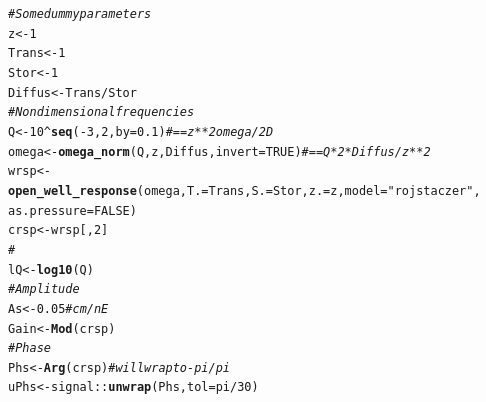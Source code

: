 \documentclass[10pt]{article}\usepackage[]{graphicx}\usepackage[]{color}
\makeatletter
\newcommand{\hlnum}[1]{\textcolor[rgb]{0.686,0.059,0.569}{#1}}%
\newcommand{\hlstr}[1]{\textcolor[rgb]{0.192,0.494,0.8}{#1}}%
\newcommand{\hlcom}[1]{\textcolor[rgb]{0.678,0.584,0.686}{\textit{#1}}}%
\newcommand{\hlopt}[1]{\textcolor[rgb]{0,0,0}{#1}}%
\newcommand{\hlstd}[1]{\textcolor[rgb]{0.345,0.345,0.345}{#1}}%
\newcommand{\hlkwb}[1]{\textcolor[rgb]{0.69,0.353,0.396}{#1}}%
\newcommand{\hlkwc}[1]{\textcolor[rgb]{0.333,0.667,0.333}{#1}}%
\newcommand{\hlkwd}[1]{\textcolor[rgb]{0.737,0.353,0.396}{\textbf{#1}}}%
\newenvironment{kframe}{%
 \def\at@end@of@kframe{}%
 \ifinner\ifhmode%
  \def\at@end@of@kframe{\end{minipage}}%
  \begin{minipage}{\columnwidth}%
 \fi\fi%
 \def\FrameCommand##1{\hskip\@totalleftmargin \hskip-\fboxsep
 \colorbox{shadecolor}{##1}\hskip-\fboxsep
     \hskip-\linewidth \hskip-\@totalleftmargin \hskip\columnwidth}%
 \MakeFramed {\advance\hsize-\width
   \@totalleftmargin\z@ \linewidth\hsize
   \@setminipage}}%
 {\par\unskip\endMakeFramed%
 \at@end@of@kframe}
\newenvironment{knitrout}{}{} %
\makeatother
\begin{document}
\begin{knitrout}
\color{fgcolor}\begin{kframe}
\begin{alltt}
\hlcom{# Some dummy parameters}
\hlstd{z} \hlkwb{<-} \hlnum{1}
\hlstd{Trans} \hlkwb{<-} \hlnum{1}
\hlstd{Stor} \hlkwb{<-} \hlnum{1}
\hlstd{Diffus} \hlkwb{<-} \hlstd{Trans}\hlopt{/}\hlstd{Stor}
\hlcom{# Nondimensional frequencies}
\hlstd{Q} \hlkwb{<-} \hlnum{10}\hlopt{^}\hlkwd{seq}\hlstd{(}\hlopt{-}\hlnum{3}\hlstd{,} \hlnum{2}\hlstd{,} \hlkwc{by} \hlstd{=} \hlnum{0.1}\hlstd{)}  \hlcom{# == z**2 omega / 2 D}
\hlstd{omega} \hlkwb{<-} \hlkwd{omega_norm}\hlstd{(Q, z, Diffus,} \hlkwc{invert} \hlstd{=} \hlnum{TRUE}\hlstd{)}  \hlcom{# == Q * 2 * Diffus / z**2}
\hlstd{wrsp} \hlkwb{<-} \hlkwd{open_well_response}\hlstd{(omega,} \hlkwc{T.} \hlstd{= Trans,} \hlkwc{S.} \hlstd{= Stor,} \hlkwc{z.} \hlstd{= z,} \hlkwc{model} \hlstd{=} \hlstr{"rojstaczer"}\hlstd{,}
    \hlkwc{as.pressure} \hlstd{=} \hlnum{FALSE}\hlstd{)}
\hlstd{crsp} \hlkwb{<-} \hlstd{wrsp[,} \hlnum{2}\hlstd{]}
\hlcom{# }
\hlstd{lQ} \hlkwb{<-} \hlkwd{log10}\hlstd{(Q)}
\hlcom{# Amplitude}
\hlstd{As} \hlkwb{<-} \hlnum{0.05}  \hlcom{# cm/nE}
\hlstd{Gain} \hlkwb{<-} \hlkwd{Mod}\hlstd{(crsp)}
\hlcom{# Phase}
\hlstd{Phs} \hlkwb{<-} \hlkwd{Arg}\hlstd{(crsp)}  \hlcom{# will wrap to -pi/pi}
\hlstd{uPhs} \hlkwb{<-} \hlstd{signal::}\hlkwd{unwrap}\hlstd{(Phs,} \hlkwc{tol} \hlstd{= pi}\hlopt{/}\hlnum{30}\hlstd{)}
\end{alltt}
\end{kframe}
\end{knitrout}
\end{document}
